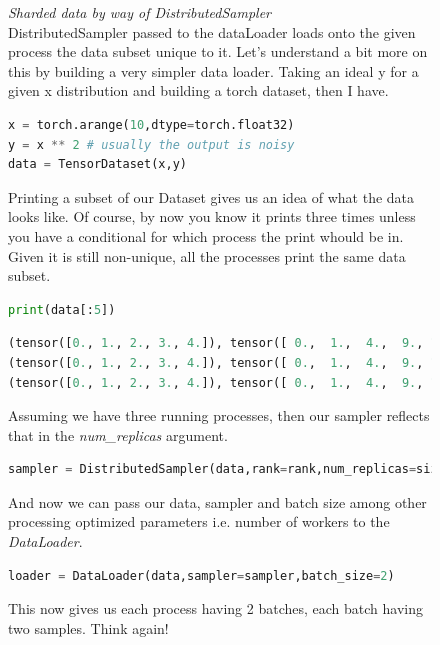\documentclass[12pt]{article}
\newcommand{\customtext}[3]{%
    \vspace{#2} %
    \fontsize{13}{8}\textcolor{#1}{\textit{#3}}%
}
\begin{document}
\pagebreak
\begin{figure}[!htb]
    \begin{minipage}[t]{0.65\textwidth}
    \raggedright
    \customtext{xtitle}{0em}{Sharded data by way of DistributedSampler}\\
        DistributedSampler passed to the dataLoader loads onto the given process the data subset 
        unique to it. Let's understand a bit more on this by building a very simpler data loader.
        Taking an ideal y for a given x distribution and building a torch dataset, then I have.
\begin{lstlisting}[language=python,style=python,basicstyle=\ttfamily\footnotesize]
x = torch.arange(10,dtype=torch.float32)
y = x ** 2 # usually the output is noisy
data = TensorDataset(x,y)
\end{lstlisting}
Printing a subset of our Dataset gives us an idea of what the data looks like. Of course, 
by now you know it prints three times unless you have a conditional for which process the 
print whould be in. Given it is still non-unique, all the processes print the same data subset. 
\begin{lstlisting}[language=python,style=python,basicstyle=\ttfamily\footnotesize]
print(data[:5])
\end{lstlisting}
\begin{lstlisting}[language=python,style=python,basicstyle=\ttfamily\scriptsize]
(tensor([0., 1., 2., 3., 4.]), tensor([ 0.,  1.,  4.,  9., 16.]))
(tensor([0., 1., 2., 3., 4.]), tensor([ 0.,  1.,  4.,  9., 16.]))
(tensor([0., 1., 2., 3., 4.]), tensor([ 0.,  1.,  4.,  9., 16.]))
\end{lstlisting}
Assuming we have three running processes, then our sampler reflects that in the 
{\it\color{Maroon}num\_replicas} argument.
\begin{lstlisting}[language=python,style=python,basicstyle=\ttfamily\footnotesize]
sampler = DistributedSampler(data,rank=rank,num_replicas=size)
\end{lstlisting}
And now we can pass our data, sampler and batch size among other processing optimized 
parameters i.e. number of workers to the {\it\color{xlink}DataLoader}.
\begin{lstlisting}[language=python,style=python,basicstyle=\ttfamily\footnotesize]
loader = DataLoader(data,sampler=sampler,batch_size=2)
\end{lstlisting}
This now gives us each process having 2 batches, each batch having two samples. Think again!

\end{minipage}
\end{figure}
\end{document}
